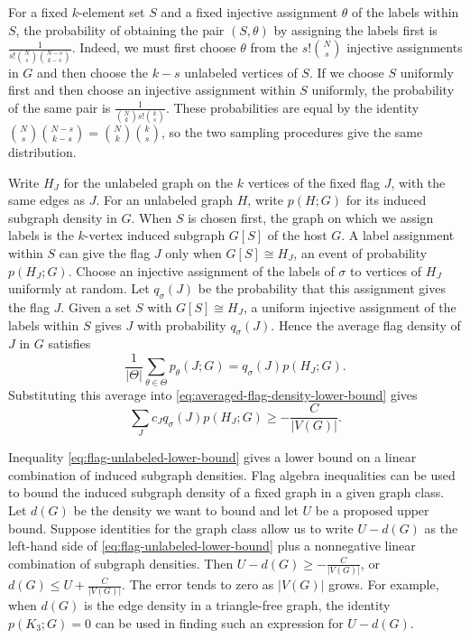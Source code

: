 For a fixed $k$-element set $S$ and a fixed injective assignment
$\theta$ of the labels within $S$, the probability of obtaining
the pair $(S,\theta)$ by assigning the labels first is
$\frac{1}{s!\binom{N}{s}\binom{N-s}{k-s}}$. Indeed, we must first
choose $\theta$ from the $s!\binom{N}{s}$ injective assignments
in $G$ and then choose the $k-s$ unlabeled vertices of $S$.
If we choose $S$ uniformly first and then choose an injective
assignment within $S$ uniformly, the probability of the same pair
is $\frac{1}{\binom{N}{k}s!\binom{k}{s}}$. These probabilities are
equal by the identity
$\binom{N}{s}\binom{N-s}{k-s}=\binom{N}{k}\binom{k}{s}$,
so the two sampling procedures give the same distribution.

Write $H_J$ for the unlabeled graph on the $k$ vertices of the
fixed flag $J$, with the same edges as $J$. For an unlabeled
graph $H$, write $p(H;G)$ for its induced subgraph density in $G$.
When $S$ is chosen first, the graph on which we assign labels is
the $k$-vertex induced subgraph $G[S]$ of the host $G$. A label
assignment within $S$ can give the flag $J$ only when
$G[S]\cong H_J$, an event of probability $p(H_J;G)$.
Choose an injective assignment of the labels of $\sigma$ to
vertices of $H_J$ uniformly at random. Let $q_\sigma(J)$ be the
probability that this assignment gives the flag $J$. Given a set
$S$ with $G[S]\cong H_J$, a uniform injective assignment of the
labels within $S$ gives $J$ with probability $q_\sigma(J)$. Hence
the average flag density of $J$ in $G$ satisfies
\[
  \frac{1}{|\Theta|}\sum_{\theta\in\Theta}p_\theta(J;G)
    =q_\sigma(J)p(H_J;G).
\]
Substituting this average into
\eqref{eq:averaged-flag-density-lower-bound} gives
\begin{equation}\label{eq:flag-unlabeled-lower-bound}
  \sum_J c_Jq_\sigma(J)p(H_J;G)
    \geq -\frac{C}{|V(G)|}.
\end{equation}

Inequality \eqref{eq:flag-unlabeled-lower-bound} gives a lower
bound on a linear combination of induced subgraph densities.
Flag algebra inequalities can be used to bound the induced
subgraph density of a fixed graph in a given graph class.
Let $d(G)$ be the density we want to bound and let $U$ be a
proposed upper bound. Suppose
identities for the graph class allow us to write $U-d(G)$ as
the left-hand side of \eqref{eq:flag-unlabeled-lower-bound}
plus a nonnegative linear combination of subgraph densities. Then
$U-d(G)\geq-\frac{C}{|V(G)|}$, or
$d(G)\leq U+\frac{C}{|V(G)|}$. The error tends to zero as
$|V(G)|$ grows. For example, when $d(G)$ is the edge density
in a triangle-free graph, the identity $p(K_3;G)=0$ can be
used in finding such an expression for $U-d(G)$.

